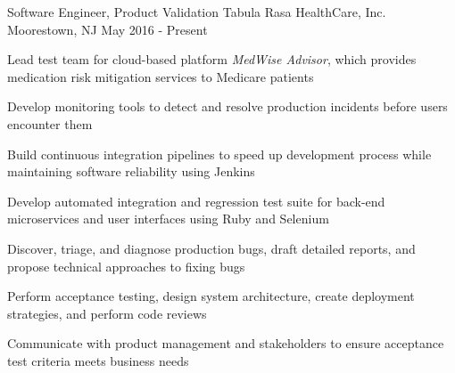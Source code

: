 \begin{cventries}
%

  \cventry
    {Software Engineer, Product Validation} %
    {Tabula Rasa HealthCare, Inc.} %
    {Moorestown, NJ} %
    {May 2016 - Present} %
    {
      \begin{cvitems} %
        \item {Lead test team for cloud-based platform \emph{MedWise Advisor}, which provides medication risk mitigation services to Medicare patients}
        \item {Develop monitoring tools to detect and resolve production incidents before users encounter them}
        \item {Build continuous integration pipelines to speed up development process while maintaining software reliability using Jenkins}
        \item {Develop automated integration and regression test suite for back-end microservices and user interfaces using Ruby and Selenium}
        \item {Discover, triage, and diagnose production bugs, draft detailed reports, and propose technical approaches to fixing bugs}
        \item {Perform acceptance testing, design system architecture, create deployment strategies, and perform code reviews}
        \item {Communicate with product management and stakeholders to ensure acceptance test criteria meets business needs}
      \end{cvitems}
    }


\end{cventries}
